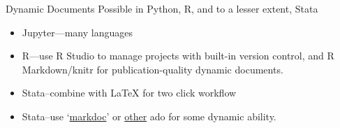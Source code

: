 \documentclass{beamer}
\begin{document}
\begin{frame}{Dynamic Documents}
Possible in Python, R, and to a lesser extent, Stata

\begin{itemize}
\item Jupyter---many languages
\item R---use R Studio to manage projects with built-in version control, and R Markdown/knitr for publication-quality dynamic documents.
\item Stata--combine with LaTeX for two click workflow
\item Stata--use `\href{https://github.com/haghish/MarkDoc}{markdoc}' or \href{http://www.stata.com/meeting/oceania16/slides/rising-oceania16.pdf}{other} ado for some dynamic ability.
\end{itemize} 
\end{frame}

 
 { %
    \begin{frame}[plain, label=AEAreg]
     \end{frame}
}
\end{document}
